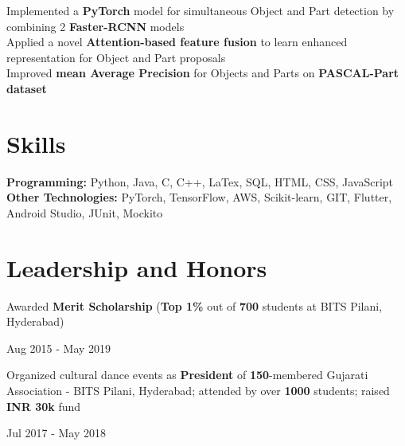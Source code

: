 \documentclass[]{Resume}
\begin{document}
\pt Implemented a \textbf{PyTorch} model for simultaneous Object and Part detection by combining 2 \textbf{Faster-RCNN} models \\
\pt Applied a novel \textbf{Attention-based feature fusion} to learn enhanced representation for Object and Part proposals \\
\pt Improved \textbf{mean Average Precision} for Objects and Parts on \textbf{PASCAL-Part dataset}
\sectionsep

\section{Skills} 
\hrulefill

\pt \textbf{Programming:} Python, Java, C, C++, LaTex, SQL, HTML, CSS, JavaScript \\
\pt \textbf{Other Technologies:} PyTorch, TensorFlow, AWS, Scikit-learn, GIT, Flutter, Android Studio, JUnit, Mockito

\sectionsep

\section{Leadership and Honors} 
\hrulefill 

\begin{minipage}[t]{.78\textwidth}
	\pt Awarded \textbf{Merit Scholarship} (\textbf{Top 1\%} out of \textbf{700} students at BITS Pilani, Hyderabad)
\end{minipage}%
\begin{minipage}[t]{.22\textwidth}
	\hfill Aug 2015 - May 2019
\end{minipage}

\begin{minipage}[t]{.78\textwidth}
	\pt Organized cultural dance events as \textbf{President} of \textbf{150}-membered Gujarati Association - BITS Pilani, Hyderabad; attended by over \textbf{1000} students; raised \textbf{INR 30k} fund
\end{minipage}%
\begin{minipage}[t]{.22\textwidth}
	\hfill Jul 2017 - May 2018
\end{minipage}


\end{document}
